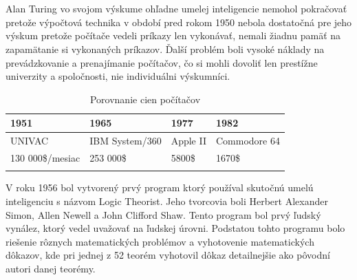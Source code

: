 \documentclass[10pt,oneside,slovak,a4paper]{article}
\begin{document}
\\\\
Alan Turing vo svojom výskume ohľadne umelej inteligencie nemohol pokračovať pretože výpočtová technika v období pred rokom 1950 nebola dostatočná pre jeho výskum pretože počítače vedeli príkazy len vykonávať, nemali žiadnu pamäť na zapamätanie si vykonaných príkazov. Ďalší problém boli vysoké náklady na prevádzkovanie a prenajímanie počítačov, čo si mohli dovoliť len prestížne univerzity a spoločnosti, nie individuálni výskumníci.\cite{HAI}
\begin{table}[tbh]
	\centering
	\caption{Porovnanie cien počítačov}
	\begin{tabular}{p{1.2in} p{1.3in} p{0.7in} p{1.1in}}
		1951 & 1965 & 1977 & 1982\\ \hline
		UNIVAC & IBM System/360 & Apple II & Commodore 64\\
		130 000\$/mesiac & 253 000\$ & 5800\$ & 1670\$\\
	\label{tab:cenyPC}
	\end{tabular}
\end{table}

V roku 1956 bol vytvorený prvý program ktorý používal skutočnú umelú inteligenciu s názvom Logic Theorist. Jeho tvorcovia boli Herbert Alexander Simon, Allen Newell a John Clifford Shaw. Tento program bol prvý ľudský vynález, ktorý vedel uvažovať na ľudskej úrovni. Podstatou tohto programu bolo riešenie rôznych matematických problémov a vyhotovenie matematických dôkazov, kde pri jednej z 52 teorém vyhotovil dôkaz detailnejšie ako pôvodní autori danej teorémy.      
\end{document}
